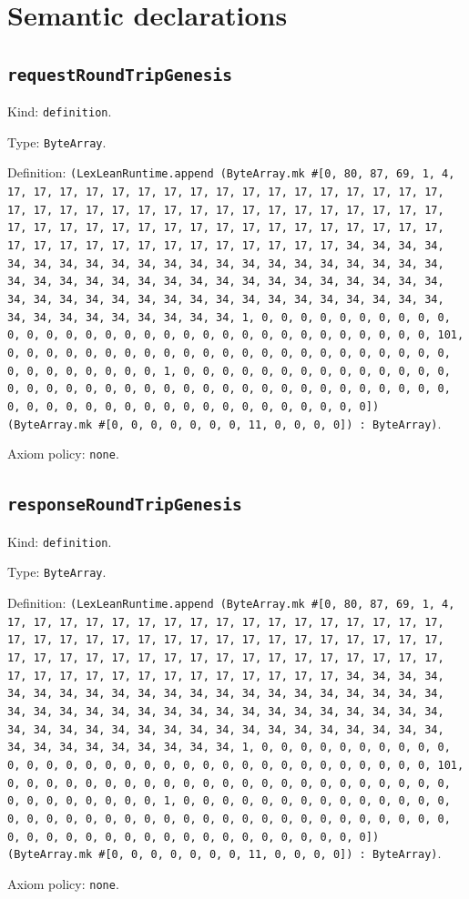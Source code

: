 \documentclass[11pt]{article}
\begin{document}
\section*{Semantic declarations}
\subsection*{\texttt{requestRoundTripGenesis}}
\noindent Kind: \texttt{definition}.\par
\noindent Type: \texttt{ByteArray}.\par
\noindent Definition: \texttt{(LexLeanRuntime.append (ByteArray.mk \#[0, 80, 87, 69, 1, 4, 17, 17, 17, 17, 17, 17, 17, 17, 17, 17, 17, 17, 17, 17, 17, 17, 17, 17, 17, 17, 17, 17, 17, 17, 17, 17, 17, 17, 17, 17, 17, 17, 17, 17, 17, 17, 17, 17, 17, 17, 17, 17, 17, 17, 17, 17, 17, 17, 17, 17, 17, 17, 17, 17, 17, 17, 17, 17, 17, 17, 17, 17, 17, 17, 34, 34, 34, 34, 34, 34, 34, 34, 34, 34, 34, 34, 34, 34, 34, 34, 34, 34, 34, 34, 34, 34, 34, 34, 34, 34, 34, 34, 34, 34, 34, 34, 34, 34, 34, 34, 34, 34, 34, 34, 34, 34, 34, 34, 34, 34, 34, 34, 34, 34, 34, 34, 34, 34, 34, 34, 34, 34, 34, 34, 34, 34, 34, 34, 1, 0, 0, 0, 0, 0, 0, 0, 0, 0, 0, 0, 0, 0, 0, 0, 0, 0, 0, 0, 0, 0, 0, 0, 0, 0, 0, 0, 0, 0, 0, 0, 0, 101, 0, 0, 0, 0, 0, 0, 0, 0, 0, 0, 0, 0, 0, 0, 0, 0, 0, 0, 0, 0, 0, 0, 0, 0, 0, 0, 0, 0, 0, 0, 0, 1, 0, 0, 0, 0, 0, 0, 0, 0, 0, 0, 0, 0, 0, 0, 0, 0, 0, 0, 0, 0, 0, 0, 0, 0, 0, 0, 0, 0, 0, 0, 0, 0, 0, 0, 0, 0, 0, 0, 0, 0, 0, 0, 0, 0, 0, 0, 0, 0, 0, 0, 0, 0, 0, 0, 0, 0]) (ByteArray.mk \#[0, 0, 0, 0, 0, 0, 0, 11, 0, 0, 0, 0]) : ByteArray)}.\par
\noindent Axiom policy: \texttt{none}.\par
\subsection*{\texttt{responseRoundTripGenesis}}
\noindent Kind: \texttt{definition}.\par
\noindent Type: \texttt{ByteArray}.\par
\noindent Definition: \texttt{(LexLeanRuntime.append (ByteArray.mk \#[0, 80, 87, 69, 1, 4, 17, 17, 17, 17, 17, 17, 17, 17, 17, 17, 17, 17, 17, 17, 17, 17, 17, 17, 17, 17, 17, 17, 17, 17, 17, 17, 17, 17, 17, 17, 17, 17, 17, 17, 17, 17, 17, 17, 17, 17, 17, 17, 17, 17, 17, 17, 17, 17, 17, 17, 17, 17, 17, 17, 17, 17, 17, 17, 17, 17, 17, 17, 17, 17, 34, 34, 34, 34, 34, 34, 34, 34, 34, 34, 34, 34, 34, 34, 34, 34, 34, 34, 34, 34, 34, 34, 34, 34, 34, 34, 34, 34, 34, 34, 34, 34, 34, 34, 34, 34, 34, 34, 34, 34, 34, 34, 34, 34, 34, 34, 34, 34, 34, 34, 34, 34, 34, 34, 34, 34, 34, 34, 34, 34, 34, 34, 34, 34, 1, 0, 0, 0, 0, 0, 0, 0, 0, 0, 0, 0, 0, 0, 0, 0, 0, 0, 0, 0, 0, 0, 0, 0, 0, 0, 0, 0, 0, 0, 0, 0, 0, 101, 0, 0, 0, 0, 0, 0, 0, 0, 0, 0, 0, 0, 0, 0, 0, 0, 0, 0, 0, 0, 0, 0, 0, 0, 0, 0, 0, 0, 0, 0, 0, 1, 0, 0, 0, 0, 0, 0, 0, 0, 0, 0, 0, 0, 0, 0, 0, 0, 0, 0, 0, 0, 0, 0, 0, 0, 0, 0, 0, 0, 0, 0, 0, 0, 0, 0, 0, 0, 0, 0, 0, 0, 0, 0, 0, 0, 0, 0, 0, 0, 0, 0, 0, 0, 0, 0, 0, 0]) (ByteArray.mk \#[0, 0, 0, 0, 0, 0, 0, 11, 0, 0, 0, 0]) : ByteArray)}.\par
\noindent Axiom policy: \texttt{none}.\par
\end{document}
